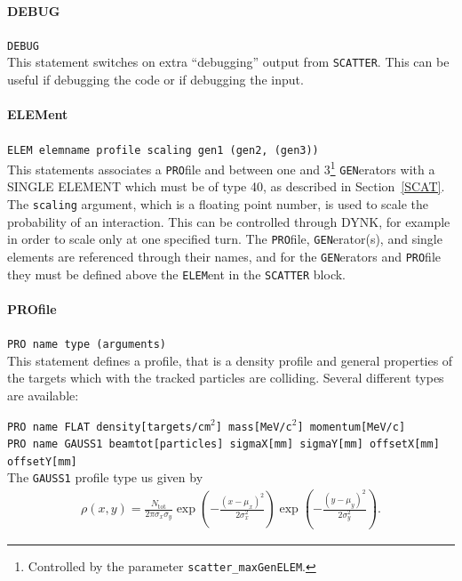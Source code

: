 \paragraph{DEBUG} \texttt{DEBUG}\\

This statement switches on extra ``debugging'' output from \texttt{SCATTER}.
This can be useful if debugging the code or if debugging the input.

\paragraph{ELEMent} \texttt{ELEM elemname profile scaling gen1 (gen2, (gen3))}\\

This statements associates a \texttt{PRO}file and between one and 3\footnote{Controlled by the parameter \texttt{scatter\_maxGenELEM}.} \texttt{GEN}erators with a SINGLE ELEMENT which must be of type 40, as described in Section~\ref{SCAT}.
The \texttt{scaling} argument, which is a floating point number, is used to scale the probability of an interaction.
This can be controlled through DYNK, for example in order to scale only at one specified turn.
The \texttt{PRO}file, \texttt{GEN}erator(s), and single elements are referenced through their names, and for the \texttt{GEN}erators and \texttt{PRO}file they must be defined above the \texttt{ELEM}ent in the \texttt{SCATTER} block.

\paragraph{PROfile} \texttt{PRO name type (arguments)} \\

This statement defines a profile, that is a density profile and general properties of the targets which with the tracked particles are colliding.
Several different types are available:

\bigskip
\noindent\texttt{PRO name FLAT density[targets/cm$^2$] mass[MeV/c$^2$] momentum[MeV/c]}\\

\bigskip
\noindent\texttt{PRO name GAUSS1 beamtot[particles] sigmaX[mm] sigmaY[mm] offsetX[mm] offsetY[mm]} \\

The \texttt{GAUSS1} profile type us given by
\begin{align}
    \rho(x,y) = \frac{N_{\mathrm{tot}}}{2\pi\sigma_x\sigma_y}
                \exp\left(-\frac{(x-\mu_x)^2}{2\sigma_x^2}\right)
                \exp\left(-\frac{(y-\mu_y)^2}{2\sigma_y^2}\right).
\end{align}

